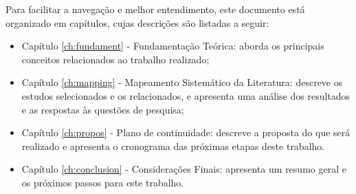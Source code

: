 Para facilitar a navegação e melhor entendimento, este documento está organizado em capítulos, cujas descrições são listadas a seguir:
\begin{itemize}
    \item Capítulo \ref{ch:fundament} - Fundamentação Teórica: aborda os principais conceitos relacionados ao trabalho realizado;
    \item Capítulo \ref{ch:mapping} - Mapeamento Sistemático da Literatura: descreve os estudos selecionados e os relacionados,
     e apresenta uma análise dos resultados e as respostas às questões de pesquisa;
    \item Capítulo \ref{ch:propos} - Plano de continuidade: descreve a proposta do que será realizado e apresenta o cronograma das próximas etapas deste trabalho.
    \item Capítulo \ref{ch:conclusion} - Considerações Finais: apresenta um resumo geral e os próximos passos para este trabalho.
\end{itemize}
